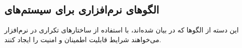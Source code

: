 \subsection{الگوهای نرم‌افزاری برای سیستم‌های }
\begin{RTL}
این دسته از الگوها که در \cite{ref5} بیان شده‌اند، با استفاده از
ساختارهای تکراری در نرم‌افزار می‌خواهند شرایط قابلیت اطمینان
و امنیت را ایجاد کنند.
\end{RTL}





